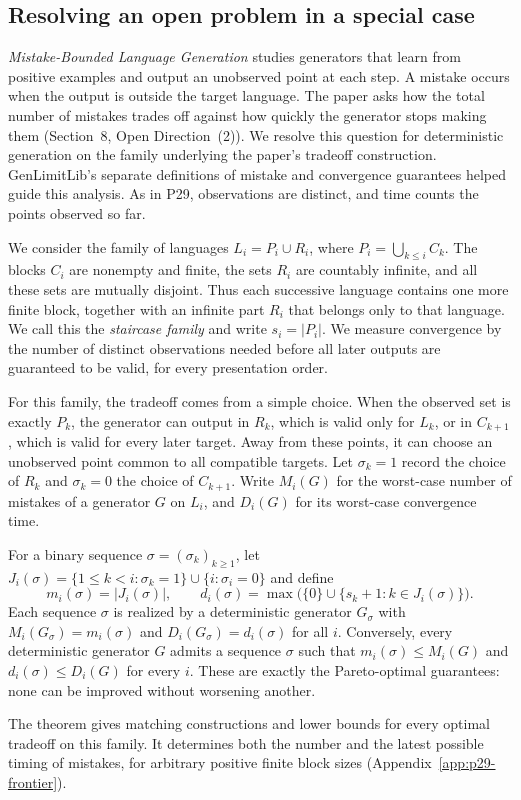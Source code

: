\subsection{Resolving an open problem in a special case}
\label{sec:new-mathematics}
\emph{Mistake-Bounded Language Generation} \citep[][P29]{mistake}
studies generators that learn from positive examples and output an unobserved
point at each step. A mistake occurs when the output is outside the target
language. The paper asks how the total number of mistakes trades off against
how quickly the generator stops making them (Section~8, Open Direction~(2)).
We resolve this question for deterministic generation on the family underlying
the paper's tradeoff construction. GenLimitLib's separate definitions of
mistake and convergence guarantees helped guide this analysis.
As in P29, observations are distinct, and time counts the points observed so far.

We consider the family of languages $L_i=P_i\cup R_i$,
where $P_i=\bigcup_{k\le i}C_k$. The blocks $C_i$ are nonempty and finite,
the sets $R_i$ are countably infinite, and all these sets are mutually disjoint.
Thus each successive language contains one more finite block, together with
an infinite part $R_i$ that belongs only to that language. We call this the \emph{staircase family} and write $s_i=|P_i|$.
We measure convergence by the number of distinct observations needed before
all later outputs are guaranteed to be valid, for every presentation order.

For this family, the tradeoff comes from a simple choice. When the observed
set is exactly $P_k$, the generator can output in $R_k$, which is valid only
for $L_k$, or in $C_{k+1}$, which is valid for every later target.
Away from these points, it can choose an unobserved point common to all
compatible targets. Let $\sigma_k=1$ record the choice of $R_k$ and
$\sigma_k=0$ the choice of $C_{k+1}$. Write $M_i(G)$ for the worst-case
number of mistakes of a generator $G$ on $L_i$, and $D_i(G)$ for its
worst-case convergence time.

\begin{result}
\label{thm:staircase-frontier}
For a binary sequence $\sigma=(\sigma_k)_{k\ge1}$, let
$J_i(\sigma)=\{1\le k<i:\sigma_k=1\}\cup\{i:\sigma_i=0\}$ and define
\[
 m_i(\sigma)=|J_i(\sigma)|,\qquad
 d_i(\sigma)=\max\bigl(\{0\}\cup\{s_k+1:k\in J_i(\sigma)\}\bigr).
\]
Each sequence $\sigma$ is realized by a deterministic generator $G_\sigma$
with $M_i(G_\sigma)=m_i(\sigma)$ and $D_i(G_\sigma)=d_i(\sigma)$ for all $i$.
Conversely, every deterministic generator $G$ admits a sequence $\sigma$
such that $m_i(\sigma)\le M_i(G)$ and $d_i(\sigma)\le D_i(G)$ for every $i$.
These are exactly the Pareto-optimal guarantees: none can be improved
without worsening another.
\end{result}

The theorem gives matching constructions and lower bounds for every optimal
tradeoff on this family. It determines both the number and the latest possible
timing of mistakes, for arbitrary positive finite block sizes
(Appendix~\ref{app:p29-frontier}).
